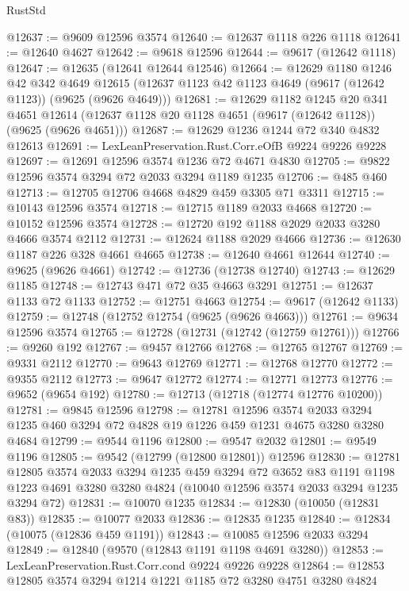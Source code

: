 \begin{lexlean}{RustStd}
\begin{coremodule}
@12637 := @9609 @12596 @3574
@12640 := @12637 @1118 @226 @1118
@12641 := @12640 @4627
@12642 := @9618 @12596
@12644 := @9617 (@12642 @1118)
@12647 := @12635 (@12641 @12644 @12546)
@12664 := @12629
    @1180
    @1246
    @42
    @342
    @4649
    @12615
    (@12637 @1123 @42 @1123 @4649 (@9617 (@12642 @1123)) (@9625 (@9626 @4649)))
@12681 := @12629
    @1182
    @1245
    @20
    @341
    @4651
    @12614
    (@12637 @1128 @20 @1128 @4651 (@9617 (@12642 @1128)) (@9625 (@9626 @4651)))
@12687 := @12629 @1236 @1244 @72 @340 @4832 @12613
@12691 := LexLeanPreservation.Rust.Corr.eOfB @9224 @9226 @9228
@12697 := @12691 @12596 @3574 @1236 @72 @4671 @4830
@12705 := @9822 @12596 @3574 @3294 @72 @2033 @3294 @1189 @1235
@12706 := @485 @460
@12713 := @12705 @12706 @4668 @4829 @459 @3305 @71 @3311
@12715 := @10143 @12596 @3574
@12718 := @12715 @1189 @2033 @4668
@12720 := @10152 @12596 @3574
@12728 := @12720 @192 @1188 @2029 @2033 @3280 @4666 @3574 @2112
@12731 := @12624 @1188 @2029 @4666
@12736 := @12630 @1187 @226 @328 @4661 @4665
@12738 := @12640 @4661 @12644
@12740 := @9625 (@9626 @4661)
@12742 := @12736 (@12738 @12740)
@12743 := @12629 @1185
@12748 := @12743 @471 @72 @35 @4663 @3291
@12751 := @12637 @1133 @72 @1133
@12752 := @12751 @4663
@12754 := @9617 (@12642 @1133)
@12759 := @12748 (@12752 @12754 (@9625 (@9626 @4663)))
@12761 := @9634 @12596 @3574
@12765 := @12728 (@12731 (@12742 (@12759 @12761)))
@12766 := @9260 @192
@12767 := @9457 @12766
@12768 := @12765 @12767
@12769 := @9331 @2112
@12770 := @9643 @12769
@12771 := @12768 @12770
@12772 := @9355 @2112
@12773 := @9647 @12772
@12774 := @12771 @12773
@12776 := @9652 (@9654 @192)
@12780 := @12713 (@12718 (@12774 @12776 @10200))
@12781 := @9845 @12596
@12798 := @12781
    @12596
    @3574
    @2033
    @3294
    @1235
    @460
    @3294
    @72
    @4828
    @19
    @1226
    @459
    @1231
    @4675
    @3280
    @3280
    @4684
@12799 := @9544 @1196
@12800 := @9547 @2032
@12801 := @9549 @1196
@12805 := @9542 (@12799 (@12800 @12801)) @12596
@12830 := @12781
    @12805
    @3574
    @2033
    @3294
    @1235
    @459
    @3294
    @72
    @3652
    @83
    @1191
    @1198
    @1223
    @4691
    @3280
    @3280
    @4824
    (@10040 @12596 @3574 @2033 @3294 @1235 @3294 @72)
@12831 := @10070 @1235
@12834 := @12830 (@10050 (@12831 @83))
@12835 := @10077 @2033
@12836 := @12835 @1235
@12840 := @12834 (@10075 (@12836 @459 @1191))
@12843 := @10085 @12596 @2033 @3294
@12849 := @12840 (@9570 (@12843 @1191 @1198 @4691 @3280))
@12853 := LexLeanPreservation.Rust.Corr.cond @9224 @9226 @9228
@12864 := @12853 @12805 @3574 @3294 @1214 @1221 @1185 @72 @3280 @4751 @3280 @4824

\end{coremodule}
\end{lexlean}
